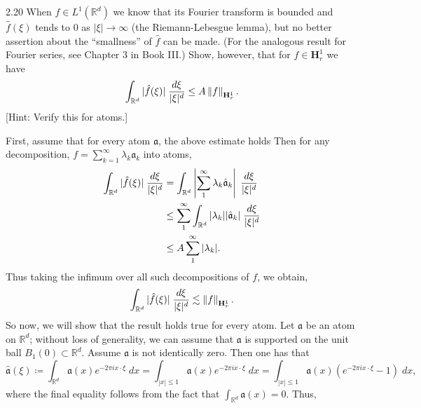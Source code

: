 \documentclass{article}
\begin{document}
\begin{prb}{2.20}
	When $f \in L^{1}(\mathbb{R}^{d})$ we know that its Fourier transform is bounded and $\hat{f}(\xi)$ tends to $0$ as $|\xi|\to \infty$ (the Riemann-Lebesgue lemma), but no better assertion about the ``smallness'' of $\hat{f}$ can be made. (For the analogous result for Fourier series, see Chapter 3 in Book III.) Show, however, that for $f \in \mathbf{H}^{1}_{r}$ we have 
	\begin{equation*}
		\int_{\mathbb{R}^{d}}|\hat{f}(\xi)|\;\frac{d\xi}{|\xi|^{d}} \leq A \left\Vert f \right\Vert_{\mathbf{H}^{1}_{r}}. 
	\end{equation*} 
	[Hint: Verify this for atoms.]
\end{prb} 
First, assume that for every atom $\mathfrak{a}$, the above estimate holds
Then for any decomposition, $f = \sum_{k = 1}^{\infty}\lambda_{k}\mathfrak{a}_{k}$ into atoms, 
\begin{align*}
	\begin{split}
		\int_{\mathbb{R}^{d}}|\hat{f}(\xi)|\;\frac{d\xi}{|\xi|^{d}} &= \int_{\mathbb{R}^{d}}\left| \sum_{1}^{\infty}\lambda_{k}\hat{\mathfrak{a}}_{k} \right|\;\frac{d\xi}{|\xi|^{d}} \\
		&\leq \sum_{1}^{\infty}\int_{\mathbb{R}^{d}}|\lambda_{k}||\hat{\mathfrak{a}}_{k}|\;\frac{d\xi}{|\xi|^{d}} \\
		&\leq A\sum_{1}^{\infty}|\lambda_{k}|. 
	\end{split} 
\end{align*} 
Thus taking the infimum over all such decompositions of $f$, we obtain, 
\begin{equation*}
	\int_{\mathbb{R}^{d}}|\hat{f}(\xi)|\;\frac{d\xi}{|\xi|^{d}} \lesssim \left\Vert f \right\Vert_{\mathbf{H}^{1}_{r}}. 
\end{equation*}
So now, we will show that the result holds true for every atom. Let $\mathfrak{a}$ be an atom on $\mathbb{R}^{d}$; without loss of generality, we can assume that $\mathfrak{a}$ is supported on the unit ball $B_{1}(0) \subset \mathbb{R}^{d}$. Assume $\mathfrak{a}$ is not identically zero. Then one has that 
\begin{equation*}
	\hat{\mathfrak{a}}(\xi) \coloneqq \int_{\mathbb{R}^{d}}\mathfrak{a}(x)e^{-2\pi i x \cdot \xi}\;dx = \int_{|x| \leq 1}\mathfrak{a}(x)e^{-2\pi i x \cdot \xi}\;dx = \int_{|x| \leq 1}\mathfrak{a}(x)\left(e^{-2\pi i x \cdot \xi} - 1\right)\;dx, 
\end{equation*} 
where the final equality follows from the fact that $\int_{\mathbb{R}^{d}} \mathfrak{a}(x) = 0$. Thus, 
\end{document}
